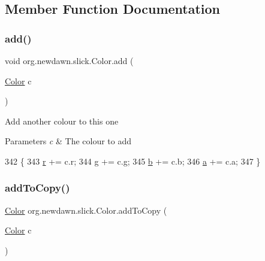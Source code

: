 \subsection{Member Function Documentation}
\mbox{\label{classorg_1_1newdawn_1_1slick_1_1_color_a1f9006bea9f8b5f69d6c494cbf4d84cb}} 
\subsubsection{\texorpdfstring{add()}{add()}}
{\footnotesize\ttfamily void org.\+newdawn.\+slick.\+Color.\+add (\begin{DoxyParamCaption}\item[{\mbox{\hyperlink{classorg_1_1newdawn_1_1slick_1_1_color}{Color}}}]{c }\end{DoxyParamCaption})\hspace{0.3cm}{\ttfamily [inline]}}

Add another colour to this one


\begin{DoxyParams}{Parameters}
{\em c} & The colour to add \\
\hline
\end{DoxyParams}

\begin{DoxyCode}
342                              \{
343         \mbox{\hyperlink{classorg_1_1newdawn_1_1slick_1_1_color_ac07fa95108064b044dcf9a53e95dcb48}{r}} += c.r;
344         \mbox{\hyperlink{classorg_1_1newdawn_1_1slick_1_1_color_aa6ebff7c102a1476e7b511a78397b753}{g}} += c.g;
345         \mbox{\hyperlink{classorg_1_1newdawn_1_1slick_1_1_color_a8c0cef152e16438fee852a97e50ef7a5}{b}} += c.b;
346         \mbox{\hyperlink{classorg_1_1newdawn_1_1slick_1_1_color_ab9288c822ff7614a77c887eb8c2595a7}{a}} += c.a;
347     \}
\end{DoxyCode}
\mbox{\label{classorg_1_1newdawn_1_1slick_1_1_color_a07a98aec99eddcfa41401f412a93b526}} 
\subsubsection{\texorpdfstring{add\+To\+Copy()}{addToCopy()}}
{\footnotesize\ttfamily \mbox{\hyperlink{classorg_1_1newdawn_1_1slick_1_1_color}{Color}} org.\+newdawn.\+slick.\+Color.\+add\+To\+Copy (\begin{DoxyParamCaption}\item[{\mbox{\hyperlink{classorg_1_1newdawn_1_1slick_1_1_color}{Color}}}]{c }\end{DoxyParamCaption})\hspace{0.3cm}{\ttfamily [inline]}}


